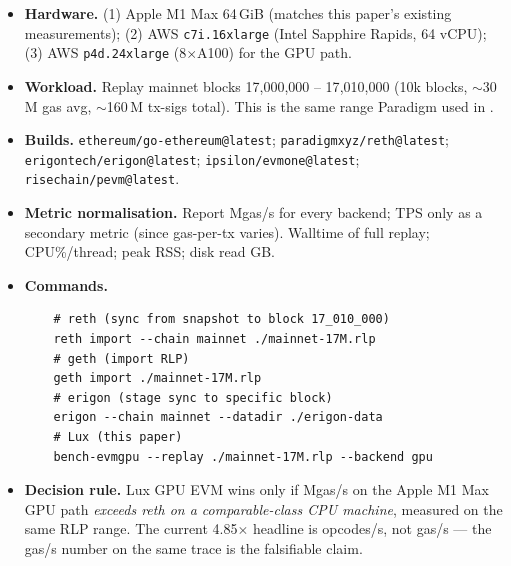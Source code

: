 \begin{itemize}
  \item \textbf{Hardware.} (1) Apple M1 Max 64\,GiB (matches this paper's
        existing measurements); (2) AWS \texttt{c7i.16xlarge} (Intel
        Sapphire Rapids, 64 vCPU); (3) AWS \texttt{p4d.24xlarge} (8$\times$A100)
        for the GPU path.
  \item \textbf{Workload.} Replay mainnet blocks 17{,}000{,}000 --
        17{,}010{,}000 (10k blocks, $\sim$30\,M gas avg, $\sim$160\,M
        tx-sigs total). This is the same range Paradigm used in
        \cite{paradigmreth2024}.
  \item \textbf{Builds.} \texttt{ethereum/go-ethereum@latest};
        \texttt{paradigmxyz/reth@latest}; \texttt{erigontech/erigon@latest};
        \texttt{ipsilon/evmone@latest}; \texttt{risechain/pevm@latest}.
  \item \textbf{Metric normalisation.} Report Mgas/s for every backend;
        TPS only as a secondary metric (since gas-per-tx varies). Walltime
        of full replay; CPU\%/thread; peak RSS; disk read GB.
  \item \textbf{Commands.}
  \begin{verbatim}
    # reth (sync from snapshot to block 17_010_000)
    reth import --chain mainnet ./mainnet-17M.rlp
    # geth (import RLP)
    geth import ./mainnet-17M.rlp
    # erigon (stage sync to specific block)
    erigon --chain mainnet --datadir ./erigon-data
    # Lux (this paper)
    bench-evmgpu --replay ./mainnet-17M.rlp --backend gpu
  \end{verbatim}
  \item \textbf{Decision rule.} Lux GPU EVM wins only if Mgas/s on the
        Apple M1 Max GPU path \emph{exceeds reth on a comparable-class
        CPU machine}, measured on the same RLP range. The current
        4.85$\times$ headline is opcodes/s, not gas/s --- the
        gas/s number on the same trace is the falsifiable claim.
\end{itemize}

